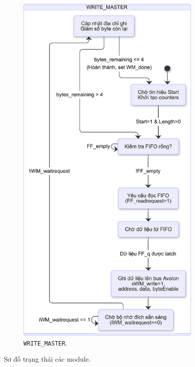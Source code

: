 \begin{figure}[htbp]
    \begin{subfigure}[b]{0.48\textwidth}
        \centering
        \includegraphics[width=\linewidth]{Images/02_13_StateDiagram_WriteMaster.pdf}
        \caption{\texttt{WRITE\_MASTER}.}
        \label{fig:02_13_StateDiagram_WriteMaster}
    \end{subfigure}
    \caption{Sơ đồ trạng thái các module.}
    \label{fig:memory_waveforms} %
\end{figure}

